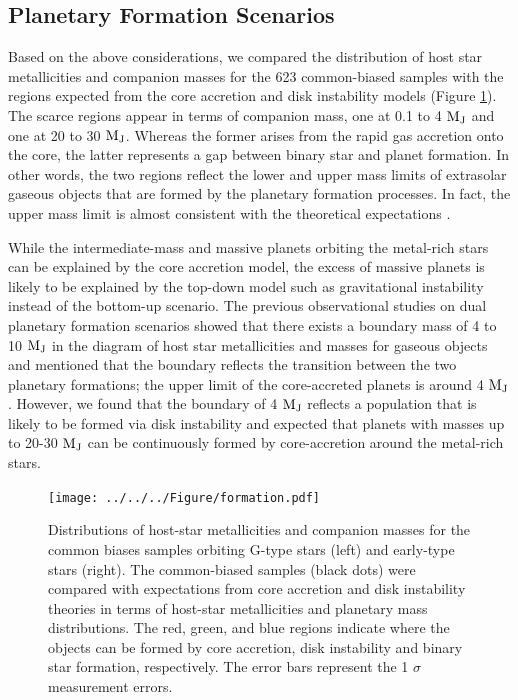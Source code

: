 \documentclass[twocolumn, dvipdfmx]{aastex62}
\begin{document}
\begin{CJK*}{UTF8}{min}
\subsection{Planetary Formation Scenarios} \label{subsec:scenarios}

Based on the above considerations, we compared the distribution of host star metallicities and companion masses for the 623 common-biased samples with the regions expected from the core accretion and disk instability models (Figure \ref{fig:metal_Mp}). The scarce regions appear in terms of companion mass, one at 0.1 to 4 $\rm M_J$ and one at 20 to 30 $\rm M_J$. Whereas the former arises from the rapid gas accretion onto the core, the latter represents a gap between binary star and planet formation. In other words, the two regions reflect the lower and upper mass limits of extrasolar gaseous objects that are formed by the planetary formation processes. In fact, the upper mass limit is almost consistent with the theoretical expectations \citep{2007ApJ...667..557T, 2012A&A...541A..97M, 2016ApJ...823...48T}.

While the intermediate-mass and massive planets orbiting the metal-rich stars can be explained by the core accretion model, the excess of massive planets is likely to be explained by the top-down model such as gravitational instability instead of the bottom-up scenario. The previous observational studies on dual planetary formation scenarios \citep{2007A&A...464..779R, 2017A&A...603A..30S, 2018ApJ...853...37S} showed that there exists a boundary mass of 4 to 10 $\rm M_J$ in the diagram of host star metallicities and masses for gaseous objects and mentioned that the boundary reflects the transition between the two planetary formations; the upper limit of the core-accreted planets is around 4 $\rm M_J$. However, we found that the boundary of 4 $\rm M_J$ reflects a population that is likely to be formed via disk instability and expected that planets with masses up to 20-30 $\rm M_J$ can be continuously formed by core-accretion around the metal-rich stars.

\begin{figure}[t]
\begin{center}
\texttt{[image: ../../../Figure/formation.pdf]}
\caption{Distributions of host-star metallicities and companion masses for the common biases samples orbiting G-type stars (left) and early-type stars (right). The common-biased samples (black dots) were compared with expectations from core accretion and disk instability theories in terms of host-star metallicities and planetary mass distributions. The red, green, and blue regions indicate where the objects can be formed by core accretion, disk instability and binary star formation, respectively. The error bars represent the 1 $\sigma$ measurement errors.
 \label{fig:metal_Mp}}
\end{center}
\end{figure}


\end{CJK*}
\end{document}
